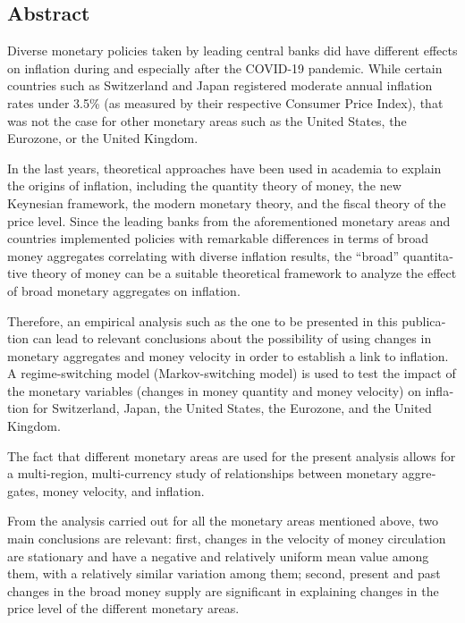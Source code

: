 \begin{otherlanguage}{english}
  \section*{Abstract}
  Diverse monetary policies taken by leading central banks did have different effects on inflation during and especially after the COVID-19 pandemic. While certain countries such as Switzerland and Japan registered moderate annual inflation rates under 3.5\% (as measured by their respective Consumer Price Index), that was not the case for other monetary areas such as the United States, the Eurozone, or the United Kingdom.

  In the last years, theoretical approaches have been used in academia to explain the origins of inflation, including the quantity theory of money, the new Keynesian framework, the modern monetary theory, and the fiscal theory of the price level. Since the leading banks from the aforementioned monetary areas and countries implemented policies with remarkable differences in terms of broad money aggregates correlating with diverse inflation results, the \enquote{broad} quantitative theory of money can be a suitable theoretical framework to analyze the effect of broad monetary aggregates on inflation.

  Therefore, an empirical analysis such as the one to be presented in this publication can lead to relevant conclusions about the possibility of using changes in monetary aggregates and money velocity in order to establish a link to inflation. A regime-switching model (Markov-switching model) is used to test the impact of the monetary variables (changes in money quantity and money velocity) on inflation for Switzerland, Japan, the United States, the Eurozone, and the United Kingdom.

  The fact that different monetary areas are used for the present analysis allows for a multi-region, multi-currency study of relationships between monetary aggregates, money velocity, and inflation.

  From the analysis carried out for all the monetary areas mentioned above, two main conclusions are relevant: first, changes in the velocity of money circulation are stationary and have a negative and relatively uniform mean value among them, with a relatively similar variation among them; second, present and past changes in the broad money supply are significant in explaining changes in the price level of the different monetary areas.
\end{otherlanguage}